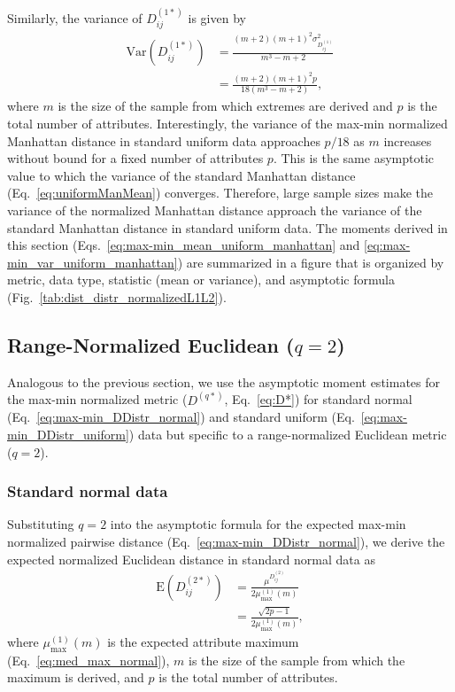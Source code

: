 \documentclass[10pt,letterpaper]{article}
\begin{document}
Similarly, the variance of $D^{(1*)}_{ij}$ is given by
%
\begin{equation}\label{eq:max-min_var_uniform_manhattan}
\begin{aligned}
\text{Var}\left(D^{(1*)}_{ij}\right) &= \frac{(m+2)(m+1)^2\sigma^2_{D^{(1)}_{ij}}}{m^3-m+2} \\
&= \frac{(m+2)(m+1)^2p}{18(m^3 - m + 2)},
\end{aligned}
\end{equation}
%
where $m$ is the size of the sample from which extremes are derived and $p$ is the total number of attributes. Interestingly, the variance of the max-min normalized Manhattan distance in standard uniform data approaches $p/18$ as $m$ increases without bound for a fixed number of attributes $p$. This is the same asymptotic value to which the variance of the standard Manhattan distance (Eq.~\ref{eq:uniformManMean}) converges. Therefore, large sample sizes make the variance of the normalized Manhattan distance approach the variance of the standard Manhattan distance in standard uniform data. The moments derived in this section (Eqs.~\ref{eq:max-min_mean_uniform_manhattan} and \ref{eq:max-min_var_uniform_manhattan}) are summarized in a figure that is organized by metric, data type, statistic (mean or variance), and asymptotic formula (Fig.~\ref{tab:dist_distr_normalizedL1L2}).

\subsection{Range-Normalized Euclidean \texorpdfstring{($q=2$)}{}}

Analogous to the previous section, we use the asymptotic moment estimates for the max-min normalized metric ($D^{(q*)}$, Eq.~\ref{eq:D*}) for standard normal (Eq.~\ref{eq:max-min_DDistr_normal}) and standard uniform (Eq.~\ref{eq:max-min_DDistr_uniform}) data but specific to a range-normalized Euclidean metric ($q=2$).

\subsubsection{Standard normal data}

Substituting $q=2$ into the asymptotic formula for the expected max-min normalized pairwise distance (Eq.~\ref{eq:max-min_DDistr_normal}), we derive the expected normalized Euclidean distance in standard normal data as
%
\begin{equation}\label{eq:max-min_mean_normal_euclidean}
\begin{aligned}
\text{E}\left(D^{(2*)}_{ij}\right) &= \frac{\mu^{D^{(2)}_{ij}}}{2\mu^{(1)}_\text{max}(m)} \\
&= \frac{\sqrt{2p - 1}}{2\mu^{(1)}_\text{max}(m)},
\end{aligned}
\end{equation}
%
where $\mu^{(1)}_\text{max}(m)$ is the expected attribute maximum (Eq.~\ref{eq:med_max_normal}), $m$ is the size of the sample from which the maximum is derived, and $p$ is the total number of attributes.
\end{document}
